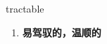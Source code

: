 
\begin{frame}
{\huge tractable}
\begin{center}
\begin{enumerate}\Large
  \item \textbf{易驾驭的，温顺的}
\end{enumerate}
\end{center}
\end{frame}
